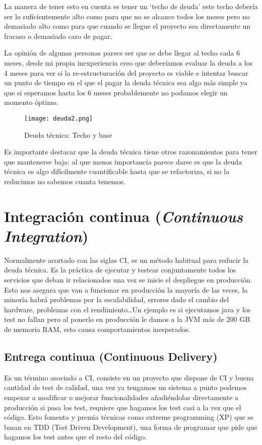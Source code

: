 La manera de tener esto en cuenta es tener un `techo de deuda' este techo debería ser lo suficientemente alto como para que no se alcance todos los meses pero no demasiado alto como para que cuando se llegue el proyecto sea directamente un fracaso o demasiado caro de pagar.

La opinión de algunas personas parece ser que se debe llegar al techo cada 6 meses, desde mi propia inexperiencia creo que deberíamos evaluar la deuda a los 4 meses para ver si la re-estructuración del proyecto es viable e intentar buscar un punto de tiempo en el que el pagar la deuda técnica sea algo más simple ya que si esperamos hasta los 6 meses probablemente no podamos elegir un momento óptimo. 

\begin{figure}
	\centering
	\texttt{[image: deuda2.png]}
	\caption{Deuda técnica: Techo y base \cite{kni13}}\label{fig:deuda2.png}
\end{figure}

Es importante destacar que la deuda técnica tiene otros razonamientos para tener que mantenerse baja: al que menos importancia parece darse es que la deuda técnica es algo difícilmente cuantificable hasta que se refactoriza, si no la reducimos no sabemos cuanta tenemos.

\section{Integración continua (\textit{Continuous Integration})}

Normalmente acortado con las siglas CI, es un método habitual para reducir la deuda técnica. Es la práctica de ejecutar y testear conjuntamente todos los servicios que deban ir relacionados una vez se inicie el despliegue en producción. Esto nos asegura que van a funcionar en producción la mayoría de las veces, la minoría habrá problemas por la escalabilidad, errores dado el cambio del hardware, problemas con el rendimiento\ldots Un ejemplo es si ejecutamos java y los test no fallan pero al ponerlo en producción le damos a la JVM más de 200 GB de memoria RAM, esto causa comportamientos inesperados.

\subsection{Entrega continua (Continuous Delivery)}

Es un término asociado a CI, consiste en un proyecto que dispone de CI y buena cantidad de test de calidad, una vez ya tengamos un sistema a punto podemos empezar a modificar o mejorar funcionalidades añadiéndolas directamente a producción si pasa los test, requiere que hagamos los test casi a la vez que el código. Esto fomenta y premia técnicas como extreme programming (XP) que se basan en TDD (Test Driven Development), una forma de programar que pide que hagamos los test antes que el resto del código.


